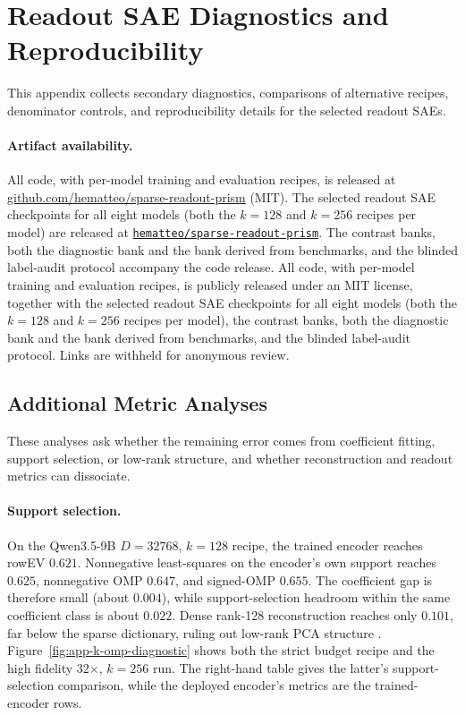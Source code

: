 
\section{Readout SAE Diagnostics and Reproducibility}
\label{app:readout-factorizer-diagnostics-reproducibility}

This appendix collects secondary diagnostics, comparisons of alternative recipes,
denominator controls, and reproducibility details for the selected readout SAEs.

\paragraph{Artifact availability.}
\ifpreprintmode
All code, with per-model training and evaluation recipes, is released at
\href{https://github.com/hematteo/sparse-readout-prism}{github.com/hematteo/sparse-readout-prism}
(MIT). The selected readout SAE checkpoints for all eight models (both the
$k{=}128$ and $k{=}256$ recipes per model) are released at
\href{https://huggingface.co/hematteo/sparse-readout-prism}{\texttt{hematteo/sparse-readout-prism}}.
The contrast banks, both the diagnostic bank and the bank derived from
benchmarks, and the blinded label-audit protocol accompany the code release.
\else
All code, with per-model training and evaluation recipes, is publicly
released under an MIT license, together with the selected readout SAE
checkpoints for all eight models (both the $k{=}128$ and $k{=}256$ recipes
per model), the contrast banks, both the diagnostic bank and the bank
derived from benchmarks, and the blinded label-audit protocol. Links are
withheld for anonymous review.
\fi

\subsection{Additional Metric Analyses}
\label{app:readout-factorizer-diagnostics}

These analyses ask whether the remaining error comes from coefficient fitting,
support selection, or low-rank structure, and whether reconstruction and
readout metrics can dissociate.

\paragraph{Support selection.}
On the Qwen3.5-9B $D=32768$, $k=128$ recipe, the trained encoder reaches rowEV
$0.621$. Nonnegative least-squares \citep{lawson1974solving} on the encoder's
own support reaches $0.625$, nonnegative OMP \citep{pati1993orthogonal}
$0.647$, and signed-OMP $0.655$. The coefficient gap is therefore small
(about $0.004$), while support-selection headroom within the same
coefficient class is about $0.022$. Dense rank-128 reconstruction reaches only $0.101$, far below the sparse
dictionary, ruling out low-rank PCA structure
\citep{jolliffe2002principal}.
Figure~\ref{fig:app-k-omp-diagnostic} shows both the strict budget recipe and
the high fidelity 32$\times$, $k=256$ run. The right-hand table gives the
latter's support-selection comparison, while the deployed
encoder's metrics are the trained-encoder rows.

